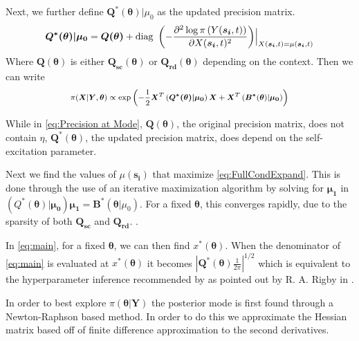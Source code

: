 \documentclass[11pt]{isuthesis}
\begin{document}
Next, we further define
$\boldsymbol{Q^*(\boldsymbol{\theta})}|\mu_0$ as the updated precision matrix.
\begin{equation}
\boldsymbol{Q^*(\boldsymbol{\theta})|\mu_0}=\boldsymbol{Q(\boldsymbol{\theta})}+\text{diag }\left(-\frac{\partial^2\log \pi\left(Y(\boldsymbol{s_i},t)\right)}{\partial X(\boldsymbol{s_i},t)^2}\right)\Bigr|_{X(\boldsymbol{s_i},t)=\mu(\boldsymbol{s_i},t)} \label{eq:Precision at Mode}\\
\end{equation}
Where $\boldsymbol{Q(\boldsymbol{\theta})}$ is either $\boldsymbol{Q_{sc}(\boldsymbol{\theta})}$ or $\boldsymbol{Q_{rd}(\boldsymbol{\theta})}$ depending on the context.  Then we can write
\begin{equation}
\footnotesize\pi(\boldsymbol{X}|\boldsymbol{Y},\boldsymbol{\theta}) \propto \exp\left(-\frac{1}{2}\boldsymbol{X}^T\left( \boldsymbol{Q^*(\boldsymbol{\theta})|\mu_0}\right)\boldsymbol{X} + \boldsymbol{X}^T\left( \boldsymbol{B^*}(\boldsymbol{\theta})|\boldsymbol{\mu_0}\right)\right) \label{eq:FullCondExpand}
\end{equation}


While in \eqref{eq:Precision at Mode}, $\boldsymbol{Q}(\boldsymbol{\theta})$, the original precision matrix, does not contain $\eta$, $\boldsymbol{Q^*(\boldsymbol{\theta})}$, the updated precision matrix, does depend on the self-excitation parameter.


Next we find the values of $\mu(\boldsymbol{s_i})$ that maximize \eqref{eq:FullCondExpand}.  This is done through the use of an iterative maximization algorithm by solving for $\boldsymbol{\mu_1}$ in $\left(Q^*(\boldsymbol{\theta})|\boldsymbol{\mu_0}\right)\boldsymbol{\mu_1}=\boldsymbol{B^*}(\boldsymbol{\theta}|\mu_0)$. For a fixed $\boldsymbol{\theta}$, this converges rapidly, due to the sparsity of both $\boldsymbol{Q_{sc}}$ and $\boldsymbol{Q_{rd}}$.  .

In \eqref{eq:main}, for a fixed $\boldsymbol{\theta}$, we can then find $x^*(\boldsymbol{\theta})$.  When the denominator of \eqref{eq:main} is evaluated at $x^*(\boldsymbol{\theta})$ it becomes $|\boldsymbol{Q^*(\boldsymbol{\theta})}\frac{1}{2\pi}|^{1/2}$ which is equivalent to the hyperparameter inference recommended by \cite{lee1996hierarchical} as pointed out by R. A. Rigby in \cite{rue2009approximate}.  

In order to best explore $\pi(\boldsymbol{\theta}|\boldsymbol{Y})$ the posterior mode is first found through a Newton-Raphson based method.  In order to do this we approximate the Hessian matrix based off of finite difference approximation to the second derivatives.  
\end{document}
